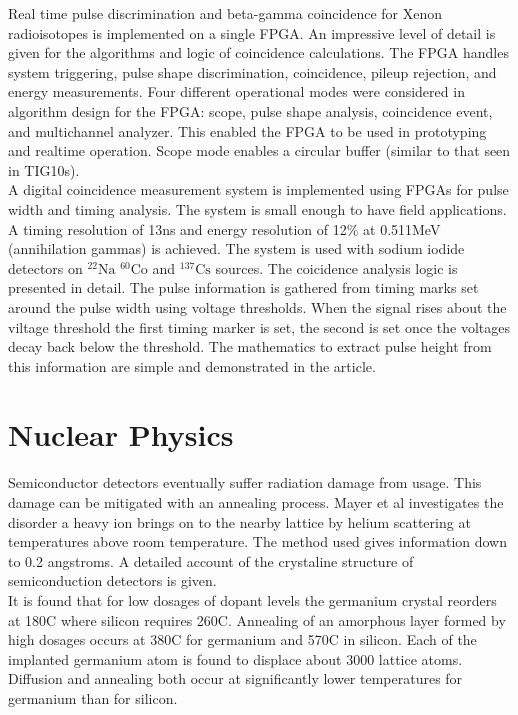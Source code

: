 \documentclass[12pt]{article}
\begin{document}
{\large\textbf{\cite{Farsoni201375}}}
Real time pulse discrimination and beta-gamma coincidence for Xenon radioisotopes is implemented on a single FPGA. An impressive level of detail is given for the algorithms and logic of coincidence calculations. The FPGA handles system triggering, pulse shape discrimination, coincidence, pileup rejection, and energy measurements. Four different operational modes were considered in algorithm design for the FPGA: scope, pulse shape analysis, coincidence event, and multichannel analyzer. This enabled the FPGA to be used in prototyping and realtime operation. Scope mode enables a circular buffer (similar to that seen in TIG10s).
\\[20pt]


{\large\textbf{\cite{Zhu2011454}}}
A digital coincidence measurement system is implemented using FPGAs for pulse width and timing analysis. The system is small enough to have field applications. A timing resolution of 13ns and energy resolution of 12\% at 0.511MeV (annihilation gammas) is achieved. The system is used with sodium iodide detectors on $^{22}\mbox{Na}$ $^{60}\mbox{Co}$ and $^{137}\mbox{Cs}$ sources. The coicidence analysis logic is presented in detail. The pulse information is gathered from timing marks set around the pulse width using voltage thresholds. When the signal rises about the viltage threshold the first timing marker is set, the second is set once the voltages decay back below the threshold. The mathematics to extract pulse height from this information are simple and demonstrated in the article.
\\[20pt]


\section{Nuclear Physics}   %

{\large\textbf{\cite{Mayer}}}

Semiconductor detectors eventually suffer radiation damage from usage. This damage can be mitigated with an annealing process. Mayer et al investigates the disorder a heavy ion brings on to the nearby lattice by helium scattering at temperatures above room temperature. The method used gives information down to 0.2 angstroms. A detailed account of the crystaline structure of semiconduction detectors is given.
\\
It is found that for low dosages of dopant levels the germanium crystal reorders at 180C where silicon requires 260C. Annealing of an amorphous layer formed by high dosages occurs at 380C for germanium and 570C in silicon. Each of the implanted germanium atom is found to displace about 3000 lattice atoms. Diffusion and annealing both occur at significantly lower temperatures for germanium than for silicon.
\\[20pt]
\end{document}
